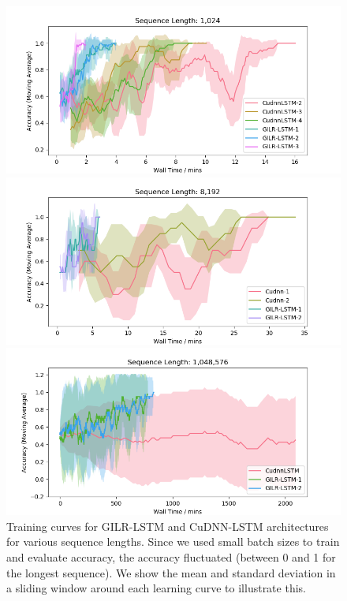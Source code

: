 \documentclass{article}
\begin{document}
\begin{figure}
  \centering
  \begin{minipage}{0.5\textwidth}
    \includegraphics[width=1.0\textwidth]{./1k_synthetic_new.png}
  \end{minipage}%
    \begin{minipage}{0.5\textwidth}
    \includegraphics[width=1.0\textwidth]{./8k_synthetic_new.png}
  \end{minipage}
  \begin{minipage}{0.5\textwidth}
    \includegraphics[width=1.0\textwidth]{./1m_synthetic_new.png}
  \end{minipage}
  \caption{Training curves for GILR-LSTM and CuDNN-LSTM architectures for various
    sequence lengths. Since we used
    small batch sizes to train and evaluate accuracy, the accuracy fluctuated
    (between 0 and 1 for the longest sequence). We show the mean and standard deviation
    in a sliding window around each learning curve to illustrate this.}
    \label{fig:synthetic_training}
  \end{figure}
  
\end{document}
